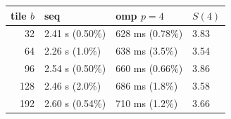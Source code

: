 \begin{tabular}{rlll}
\toprule
tile $b$ & seq & omp $p{=}4$ & $S(4)$ \\
\midrule
32 & 2.41 s (0.50\%) & 628 ms (0.78\%) & 3.83 \\
64 & 2.26 s (1.0\%) & 638 ms (3.5\%) & 3.54 \\
96 & 2.54 s (0.50\%) & 660 ms (0.66\%) & 3.86 \\
128 & 2.46 s (2.0\%) & 686 ms (1.8\%) & 3.58 \\
192 & 2.60 s (0.54\%) & 710 ms (1.2\%) & 3.66 \\
\bottomrule
\end{tabular}
